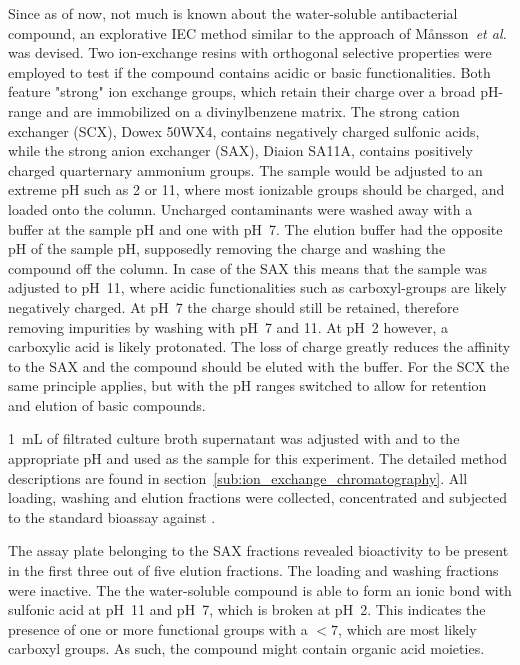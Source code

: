 	Since as of now, not much is known about the water-soluble antibacterial compound, an explorative IEC method similar to the approach of M{\aa}nsson~\textit{et al.} was devised.\autocite{Mansson2010}
	Two ion-exchange resins with orthogonal selective properties were employed to test if the compound contains acidic or basic functionalities.
	Both feature "strong" ion exchange groups, which retain their charge over a broad pH-range and are immobilized on a divinylbenzene matrix.
	The strong cation exchanger (SCX), Dowex 50WX4, contains negatively charged sulfonic acids, while the strong anion exchanger (SAX), Diaion SA11A, contains positively charged quarternary ammonium groups.
	The sample would be adjusted to an extreme pH such as 2 or 11, where most ionizable groups should be charged, and loaded onto the column.
	Uncharged contaminants were washed away with a buffer at the sample pH and one with pH~7.
	The elution buffer had the opposite pH of the sample pH, supposedly removing the charge and washing the compound off the column.
	In case of the SAX this means that the sample was adjusted to pH~11, where acidic functionalities such as carboxyl-groups are likely negatively charged.
	At pH~7 the charge should still be retained, therefore removing impurities by washing with pH~7 and 11.
	At pH~2 however, a carboxylic acid is likely protonated.
	The loss of charge greatly reduces the affinity to the SAX and the compound should be eluted with the buffer.
	For the SCX the same principle applies, but with the pH ranges switched to allow for retention and elution of basic compounds.
	
	\SI{1}{\milli\liter} of filtrated culture broth supernatant was adjusted with  and  to the appropriate pH and used as the sample for this experiment.
	The detailed method descriptions are found in section~\ref{sub:ion_exchange_chromatography}.
	All loading, washing and elution fractions were collected, concentrated and subjected to the standard bioassay against \coli.
	
	The assay plate belonging to the SAX fractions revealed bioactivity to be present in the first three out of five elution fractions.
	The loading and washing fractions were inactive.
	The the water-soluble compound is able to form an ionic bond with sulfonic acid at pH~11 and pH~7, which is broken at pH~2.
	This indicates the presence of one or more functional groups with a \pka$<7$, which are most likely carboxyl groups.
	As such, the compound might contain organic acid moieties.
	
